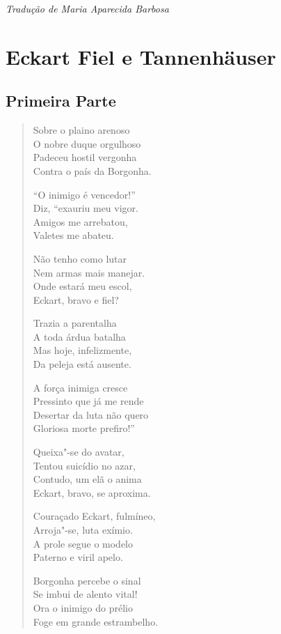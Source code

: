\hfill\textit{Tradução de Maria Aparecida Barbosa}

\chapter[Eckart Fiel e Tannenhäuser]{Eckart Fiel e Tannenhäuser}

\section{Primeira Parte}


\begin{verse}
Sobre o plaino arenoso\\
O nobre duque orgulhoso\\
Padeceu hostil vergonha\\
Contra o país da Borgonha.

``O inimigo é vencedor!''\\
Diz, ``exauriu meu vigor.\\
Amigos me arrebatou,\\
Valetes me abateu.

Não tenho como lutar\\
Nem armas mais manejar.\\
Onde estará meu escol,\\
Eckart, bravo e fiel?

Trazia a parentalha\\
A toda árdua batalha\\
Mas hoje, infelizmente,\\
Da peleja está ausente.

A força inimiga cresce\\  
Pressinto que já me rende\\
Desertar da luta não quero\\
Gloriosa morte prefiro!''

Queixa"-se do avatar,\\
Tentou suicídio no azar,\\
Contudo, um  elã o anima\\
Eckart, bravo, se aproxima. 

Couraçado Eckart, fulmíneo,\\ 
Arroja"-se, luta exímio.\\
A prole segue o modelo\\
Paterno e viril apelo.

Borgonha percebe o sinal\\
Se imbui de alento vital!\\
Ora o inimigo do prélio\\
Foge em grande estrambelho.


\end{verse}

